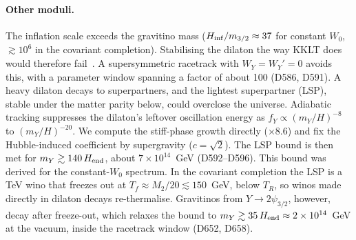 \documentclass[aps,prd,twocolumn,superscriptaddress,nofootinbib,floatfix]{revtex4-2}
\begin{document}
\paragraph{Other moduli.} The inflation scale exceeds the gravitino mass ($H_{\rm inf}/m_{3/2}\approx37$ for constant $W_0$, $\gtrsim10^6$ in the covariant completion). Stabilising the dilaton the way KKLT does would therefore fail~\cite{arXiv_hep-th_0411011}. A supersymmetric racetrack with $W_Y = W_Y' = 0$ avoids this, with a parameter window spanning a factor of about 100 (D586, D591). A heavy dilaton decays to superpartners, and the lightest superpartner (LSP), stable under the matter parity below, could overclose the universe. Adiabatic tracking suppresses the dilaton's leftover oscillation energy as $f_Y \propto (m_Y/H)^{-8}$ to $(m_Y/H)^{-20}$. We compute the stiff-phase growth directly ($\times 8.6$) and fix the Hubble-induced coefficient by supergravity ($c = \sqrt2$). The LSP bound is then met for $m_Y \gtrsim 140\,H_{\rm end}$, about $7\times10^{14}$~GeV (D592--D596). This bound was derived for the constant-$W_0$ spectrum. In the covariant completion the LSP is a TeV wino that freezes out at $T_f\approx M_2/20\lesssim150$~GeV, below $T_R$, so winos made directly in dilaton decays re-thermalise. Gravitinos from $Y\to2\psi_{3/2}$, however, decay after freeze-out, which relaxes the bound to $m_Y\gtrsim35\,H_{\rm end}\approx2\times10^{14}$~GeV at the vacuum, inside the racetrack window (D652, D658).
\end{document}
